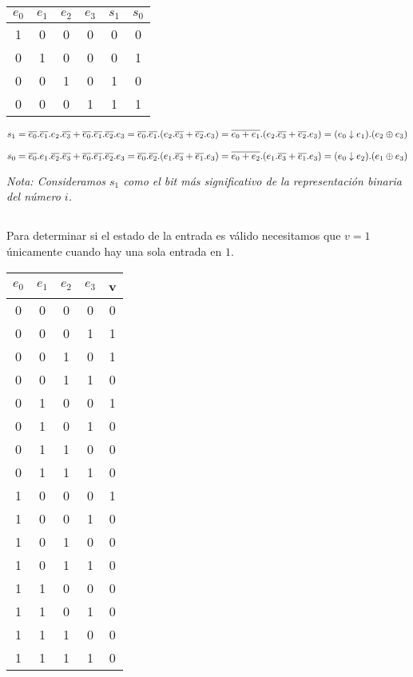 \begin{tabular}{|c|c|c|c||c|c|}
    $e_0$ & $e_1$ & $e_2$ & $e_3$ & $s_1$ & $s_0$ \\
    \hline
    1 & 0 & 0 & 0 & 0 & 0 \\
    0 & 1 & 0 & 0 & 0 & 1 \\
    0 & 0 & 1 & 0 & 1 & 0 \\
    0 & 0 & 0 & 1 & 1 & 1 \\
\end{tabular}

$
s_1
= \overline{e_0} . \overline{e_1} . e_2 . \overline{e_3} + \overline{e_0} . \overline{e_1} . \overline{e_2} . e_3
= \overline{e_0} . \overline{e_1} . (e_2 . \overline{e_3} + \overline{e_2} . e_3)
= \overline{e_0 + e_1} . (e_2 . \overline{e_3} + \overline{e_2} . e_3)
= (e_0 \downarrow e_1) . (e_2 \oplus e_3)
$

$
s_0
= \overline{e_0} . e_1 . \overline{e_2} . \overline{e_3} + \overline{e_0} . \overline{e_1} . \overline{e_2} . e_3
= \overline{e_0} . \overline{e_2} . (e_1 . \overline{e_3} + \overline{e_1} . e_3)
= \overline{e_0 + e_2} . (e_1 . \overline{e_3} + \overline{e_1} . e_3)
= (e_0 \downarrow e_2) . (e_1 \oplus e_3)
$

\emph{Nota: Consideramos $s_1$ como el bit más significativo de la representación binaria del número $i$.}

\subsection{}

Para determinar si el estado de la entrada es válido necesitamos que $v=1$ únicamente cuando hay una sola entrada en $1$.

\begin{tabular}{|c|c|c|c||c|}
    $e_0$ & $e_1$ & $e_2$ & $e_3$ & v \\
    \hline
    0 & 0 & 0 & 0 & 0 \\
    0 & 0 & 0 & 1 & 1 \\
    0 & 0 & 1 & 0 & 1 \\
    0 & 0 & 1 & 1 & 0 \\
    0 & 1 & 0 & 0 & 1 \\
    0 & 1 & 0 & 1 & 0 \\
    0 & 1 & 1 & 0 & 0 \\
    0 & 1 & 1 & 1 & 0 \\
    1 & 0 & 0 & 0 & 1 \\
    1 & 0 & 0 & 1 & 0 \\
    1 & 0 & 1 & 0 & 0 \\
    1 & 0 & 1 & 1 & 0 \\
    1 & 1 & 0 & 0 & 0 \\
    1 & 1 & 0 & 1 & 0 \\
    1 & 1 & 1 & 0 & 0 \\
    1 & 1 & 1 & 1 & 0 \\
\end{tabular}

